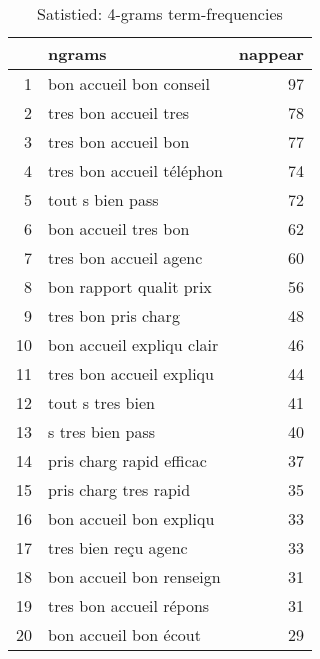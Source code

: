 \begin{table}[ht]
\centering
\begin{tabular}{rlr}
  \hline
 & ngrams & nappear \\ 
  \hline
1 & bon accueil bon conseil &  97 \\ 
  2 & tres bon accueil tres &  78 \\ 
  3 & tres bon accueil bon &  77 \\ 
  4 & tres bon accueil téléphon &  74 \\ 
  5 & tout s bien pass &  72 \\ 
  6 & bon accueil tres bon &  62 \\ 
  7 & tres bon accueil agenc &  60 \\ 
  8 & bon rapport qualit prix &  56 \\ 
  9 & tres bon pris charg &  48 \\ 
  10 & bon accueil expliqu clair &  46 \\ 
  11 & tres bon accueil expliqu &  44 \\ 
  12 & tout s tres bien &  41 \\ 
  13 & s tres bien pass &  40 \\ 
  14 & pris charg rapid efficac &  37 \\ 
  15 & pris charg tres rapid &  35 \\ 
  16 & bon accueil bon expliqu &  33 \\ 
  17 & tres bien reçu agenc &  33 \\ 
  18 & bon accueil bon renseign &  31 \\ 
  19 & tres bon accueil répons &  31 \\ 
  20 & bon accueil bon écout &  29 \\ 
   \hline
\end{tabular}
\caption{Satistied: 4-grams term-frequencies} 
\label{tab:tf_sup_4}
\end{table}
